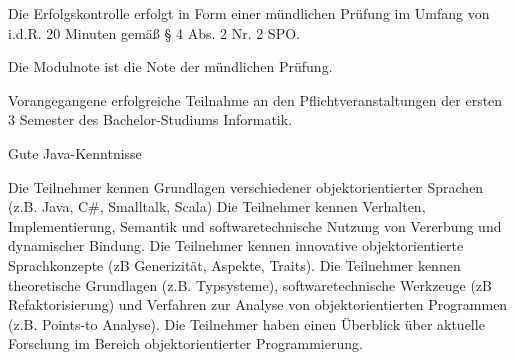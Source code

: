 \begin{module}

\setdoclanguagegerman
{}
\modulesubject{}





\modulehead


\label{mod_2393.dp_997}



\begin{styleenv}
\begin{assessment}
Die Erfolgskontrolle erfolgt in Form einer mündlichen Prüfung im Umfang von i.d.R. 20 Minuten gemäß § 4 Abs. 2 Nr. 2 SPO.

 

Die Modulnote ist die Note der mündlichen Prüfung.


\end{assessment}

\begin{conditions}Vorangegangene erfolgreiche Teilnahme an den Pflichtveranstaltungen der ersten 3 Semester des Bachelor-Studiums Informatik.

\end{conditions}

\begin{recommendations}Gute Java-Kenntnisse

\end{recommendations}
\end{styleenv}

\begin{learningoutcomes}
Die Teilnehmer kennen Grundlagen verschiedener objektorientierter Sprachen (z.B. Java, C\#, Smalltalk, Scala) Die Teilnehmer kennen Verhalten, Implementierung, Semantik und softwaretechnische Nutzung von Vererbung und dynamischer Bindung. Die Teilnehmer kennen innovative objektorientierte Sprachkonzepte (zB Generizität, Aspekte, Traits). Die Teilnehmer kennen theoretische Grundlagen (z.B. Typsysteme), softwaretechnische Werkzeuge (zB Refaktorisierung) und Verfahren zur Analyse von objektorientierten Programmen (z.B. Points-to Analyse). Die Teilnehmer haben einen Überblick über aktuelle Forschung im Bereich objektorientierter Programmierung.



\end{learningoutcomes}
\end{module}

